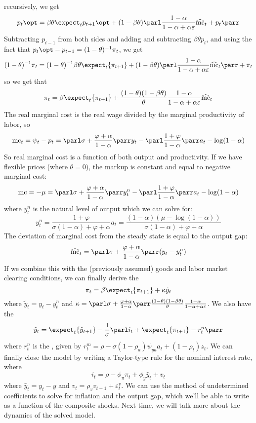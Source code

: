 \documentclass[10pt]{article}
\begin{document}
recursively, we get \[p_t\opt =\beta\theta \expect_t p_{t+1}\opt + (1-\beta\theta) \parl  \frac{1-\alpha}{1-\alpha +\alpha\varepsilon}\widehat{\text{mc}}_{t} + p_{t}\parr\]Subtracting $p_{t-1}$ from both sides and adding and subtracting $\beta\theta p_t$, and using the fact that $p_t\opt - p_{t-1} = (1-\theta)^{-1} \pi_t$, we get \[(1-\theta)^{-1} \pi_t = (1-\theta)^{-1} \beta\theta \expect_t \{\pi_{t+1}\} + (1-\beta\theta) \parl  \frac{1-\alpha}{1-\alpha +\alpha\varepsilon}\widehat{\text{mc}}_{t}\parr + \pi_t\]so we get that\[\pi_t = \beta \expect_t\{\pi_{t+1}\} + \frac{(1-\theta)(1-\beta\theta)}{\theta} \frac{1-\alpha}{1-\alpha + \alpha\varepsilon} \widehat{\text{mc}}_t\]The real marginal cost is the real wage divided by the marginal productivity of labor, so\[\text{mc}_t = \psi_t - p_t = \parl \sigma + \frac{\varphi + \alpha}{1-\alpha} \parr y_t - \parl \frac{1+\varphi}{1-\alpha}\parr a_t - \log(1-\alpha)\]So real marginal cost is a function of both output and productivity. If we have flexible prices (where $\theta=0$), the markup is constant and equal to negative marginal cost:\[\text{mc} = -\mu = \parl \sigma + \frac{\varphi + \alpha}{1-\alpha} \parr y_t^n - \parl \frac{1+\varphi}{1-\alpha}\parr a_t - \log(1-\alpha)\]where $y_t^n$ is the natural level of output which we can solve for: \[y_t^n = \frac{1+\varphi}{\sigma(1-\alpha) + \varphi + \alpha} a_t = \frac{(1-\alpha)(\mu - \log(1-\alpha))}{\sigma (1-\alpha) + \varphi + \alpha}\]The deviation of marginal cost from the steady state is equal to the output gap:\[\widehat{\text{mc}}_t = \parl \sigma + \frac{\varphi+\alpha}{1-\alpha}\parr (y_t - y_t^n)\]If we combine this with the (previously assumed) goods and labor market clearing conditions, we can finally derive the \[\pi_t = \beta \expect_t\{\pi_{t+1}\} + \kappa \tilde{y}_t\]where $\tilde{y}_t = y_t - y_t^n$ and $\kappa = \parl \sigma + \frac{\varphi + \alpha}{1-\alpha}\parr \frac{(1-\theta)(1-\beta\theta)}{\theta} \frac{1-\alpha}{1-\alpha+\alpha\varepsilon}$. We also have the \[\tilde{y}_t = \expect_t\{\tilde{y}_{t+1}\} - \frac{1}{\sigma} \parl i_t + \expect_t\{\pi_{t+1}\}-r_t^n\parr\]where $r_t^n$ is the , given by $r_t^m = \rho - \sigma(1-\rho_a)\psi_{ya}a_t + (1-\rho_t) z_t$. We can finally close the model by writing a Taylor-type rule for the nominal interest rate, where \[i_t = \rho - \phi_\pi \pi_t + \phi_y \hat{y}_t + v_t\]where $\hat{y}_t = y_t - y$ and $v_t = \rho_v v_{t-1} + \varepsilon_t^v$. We can use the method of undetermined coefficients to solve for inflation and the output gap, which we'll be able to write as a function of the composite shocks. Next time, we will talk more about the dynamics of the solved model.
\end{document}
